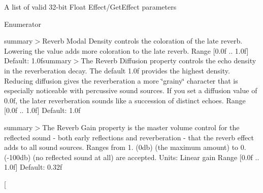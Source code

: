 A list of valid 32-\/bit Float Effect/\-Get\-Effect parameters

\begin{Desc}
\item[Enumerator]\par
\begin{description}
\item[{\em 
\hypertarget{namespace_open_t_k_1_1_audio_1_1_open_a_l_aa0356299908369b4365d28572c0ec20baa309c309aacff6853b7d850faded3dab}{Reverb\-Density}\label{namespace_open_t_k_1_1_audio_1_1_open_a_l_aa0356299908369b4365d28572c0ec20baa309c309aacff6853b7d850faded3dab}
}]summary$>$Reverb Modal Density controls the coloration of the late reverb. Lowering the value adds more coloration to the late reverb. Range \mbox{[}0.\-0f .. 1.\-0f\mbox{]} Default\-: 1.\-0fsummary$>$The Reverb Diffusion property controls the echo density in the reverberation decay. The default 1.\-0f provides the highest density. Reducing diffusion gives the reverberation a more \char`\"{}grainy\char`\"{} character that is especially noticeable with percussive sound sources. If you set a diffusion value of 0.\-0f, the later reverberation sounds like a succession of distinct echoes. Range \mbox{[}0.\-0f .. 1.\-0f\mbox{]} Default\-: 1.\-0f\item[{\em 
\hypertarget{namespace_open_t_k_1_1_audio_1_1_open_a_l_aa0356299908369b4365d28572c0ec20bafb03c552a725a0362e322f3476fdc419}{Reverb\-Diffusion}\label{namespace_open_t_k_1_1_audio_1_1_open_a_l_aa0356299908369b4365d28572c0ec20bafb03c552a725a0362e322f3476fdc419}
}]summary$>$The Reverb Gain property is the master volume control for the reflected sound -\/ both early reflections and reverberation -\/ that the reverb effect adds to all sound sources. Ranges from 1. (0db) (the maximum amount) to 0. (-\/100db) (no reflected sound at all) are accepted. Units\-: Linear gain Range \mbox{[}0.\-0f .. 1.\-0f\mbox{]} Default\-: 0.\-32f\item[{\em 
}
\end{description}
\end{Desc}
